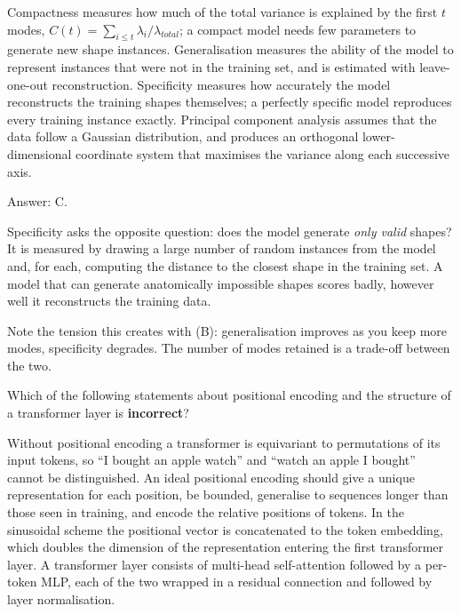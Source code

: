 \documentclass[11pt]{exam}
\begin{document}
\begin{questions}
\begin{choices}
  \choice Compactness measures how much of the total variance is explained by the first $t$ modes,
  $C(t) = \sum_{i \leq t} \lambda_i / \lambda_{total}$; a compact model needs few parameters to
  generate new shape instances.
  \choice Generalisation measures the ability of the model to represent instances that were not in
  the training set, and is estimated with leave-one-out reconstruction.
  \choice Specificity measures how accurately the model reconstructs the training shapes
  themselves; a perfectly specific model reproduces every training instance exactly.
  \choice Principal component analysis assumes that the data follow a Gaussian distribution, and
  produces an orthogonal lower-dimensional coordinate system that maximises the variance along each
  successive axis.
\end{choices}

\begin{solution}
  Answer: C.

  Specificity asks the opposite question: does the model generate \emph{only valid} shapes? It is
  measured by drawing a large number of random instances from the model and, for each, computing
  the distance to the closest shape in the training set. A model that can generate anatomically
  impossible shapes scores badly, however well it reconstructs the training data.

  Note the tension this creates with (B): generalisation improves as you keep more modes,
  specificity degrades. The number of modes retained is a trade-off between the two.
\end{solution}

\question
Which of the following statements about positional encoding and the structure of a transformer
layer is \textbf{incorrect}?

\begin{choices}
  \choice Without positional encoding a transformer is equivariant to permutations of its input
  tokens, so ``I bought an apple watch'' and ``watch an apple I bought'' cannot be distinguished.
  \choice An ideal positional encoding should give a unique representation for each position, be
  bounded, generalise to sequences longer than those seen in training, and encode the relative
  positions of tokens.
  \choice In the sinusoidal scheme the positional vector is concatenated to the token embedding,
  which doubles the dimension of the representation entering the first transformer layer.
  \choice A transformer layer consists of multi-head self-attention followed by a per-token MLP,
  each of the two wrapped in a residual connection and followed by layer normalisation.
\end{choices}


\end{questions}
\end{document}
